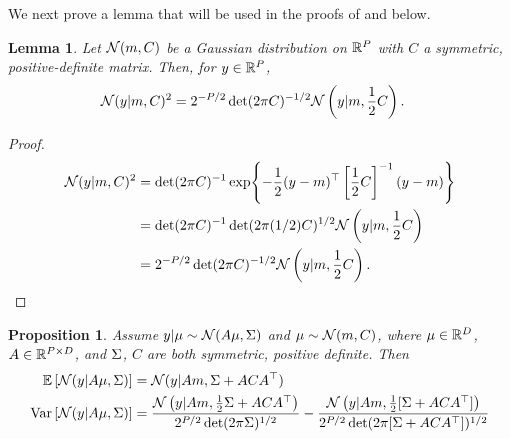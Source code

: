 \documentclass[12pt]{article}
\newtheorem{prop}{Proposition}
\newtheorem{lemma}{Lemma}
\begin{document}
We next prove a lemma that will be used in the proofs of  
and  below. 
\begin{lemma} \label{lemma:squared_Gaussian_density}
Let $\mathcal{N}(m, C)$ be a Gaussian distribution on $\mathbb{R}^{P}$ with $C$ a symmetric, positive-definite 
matrix. Then, for $y \in \mathbb{R}^{P}$, 
\begin{align*}
\mathcal{N}(y | m, C)^2 
&= 2^{-P/2} \det(2\pi C)^{-1/2} \mathcal{N}\left(y | m, \frac{1}{2}C\right). 
\end{align*}
\end{lemma}

\begin{proof}
\begin{align*}
\mathcal{N}(y | m, C)^2 
&= \det(2\pi C)^{-1} \exp\mathopen{}\left\{-\frac{1}{2} (y - m)^\top \left[\frac{1}{2}C \right]^{-1}(y - m)\right\}\mathclose{} \\
&= \det(2\pi C)^{-1} \det(2\pi (1/2)C)^{1/2} \mathcal{N}\left(y | m, \frac{1}{2}C\right) \\
&= 2^{-P/2} \det(2\pi C)^{-1/2} \mathcal{N}\left(y | m, \frac{1}{2}C\right). 
\end{align*}
\end{proof}

\begin{prop} \label{prop:Gaussian_marginal_moments}
Assume $y | \mu \sim \mathcal{N}(A \mu, \Sigma)$ and $\mu \sim \mathcal{N}(m, C)$, where $\mu \in \mathbb{R}^{D}$, 
$A \in \mathbb{R}^{P \times D}$, and $\Sigma$, $C$ are both symmetric, positive definite. Then 
\begin{align}
\mathbb{E}\left[\mathcal{N}(y | A \mu, \Sigma) \right] &= \mathcal{N}(y | Am, \Sigma + ACA^\top) \\
\mathrm{Var}\left[\mathcal{N}(y | A \mu, \Sigma) \right] 
&= \frac{\mathcal{N}\left(y | Am, \frac{1}{2} \Sigma + ACA^\top \right)}{2^{P/2} \det(2\pi \Sigma)^{1/2}} - 
\frac{\mathcal{N}\left(y | Am, \frac{1}{2}[\Sigma + ACA^\top] \right)}{2^{P/2} \det(2\pi[\Sigma + ACA^\top])^{1/2}}
\end{align}
\end{prop}
\end{document}
